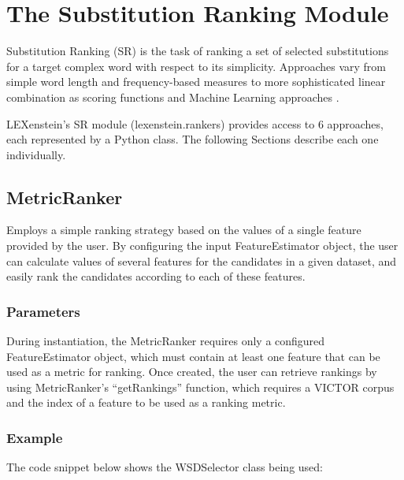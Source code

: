 \chapter{The Substitution Ranking Module}
\label{rankers}

Substitution Ranking (SR) is the task of ranking a set of selected substitutions for a target complex word with respect to its simplicity. Approaches vary from simple word length and frequency-based measures \cite{Devlin1998,Carroll98,Carroll99,Biran2011} to more sophisticated linear combination as scoring functions \cite{uowshef} and Machine Learning approaches \cite{Horn2014}.

LEXenstein's SR module (lexenstein.rankers) provides access to $6$ approaches, each represented by a Python class. The following Sections describe each one individually.












\section{MetricRanker}

Employs a simple ranking strategy based on the values of a single feature provided by the user. By configuring the input FeatureEstimator object, the user can calculate values of several features for the candidates in a given dataset, and easily rank the candidates according to each of these features.

\subsection{Parameters}

During instantiation, the MetricRanker requires only a configured FeatureEstimator object, which must contain at least one feature that can be used as a metric for ranking. Once created, the user can retrieve rankings by using MetricRanker's ``getRankings'' function, which requires a VICTOR corpus and the index of a feature to be used as a ranking metric.

\subsection{Example}

The code snippet below shows the WSDSelector class being used:


